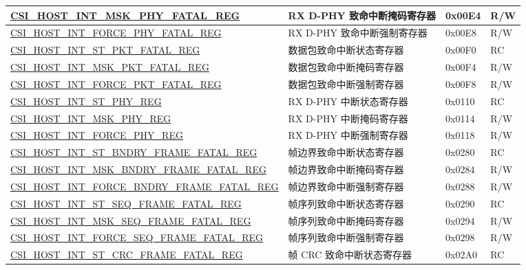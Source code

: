 \begin{longtable}{ | p{8.2cm} | p{6cm} | p{1.2cm} | p{0.8cm} | }
\hyperref[regdesc:CSIHOSTINTMSKPHYFATALREG]{CSI\_HOST\_INT\_MSK\_PHY\_FATAL\_REG} & RX D-PHY 致命中断掩码寄存器 & 0x00E4 & R/W \\ \hline
\hyperref[regdesc:CSIHOSTINTFORCEPHYFATALREG]{CSI\_HOST\_INT\_FORCE\_PHY\_FATAL\_REG} & RX D-PHY 致命中断强制寄存器 & 0x00E8 & R/W \\ \hline
\hyperref[regdesc:CSIHOSTINTSTPKTFATALREG]{CSI\_HOST\_INT\_ST\_PKT\_FATAL\_REG} & 数据包致命中断状态寄存器 & 0x00F0 & RC \\ \hline
\hyperref[regdesc:CSIHOSTINTMSKPKTFATALREG]{CSI\_HOST\_INT\_MSK\_PKT\_FATAL\_REG} & 数据包致命中断掩码寄存器 & 0x00F4 & R/W \\ \hline
\hyperref[regdesc:CSIHOSTINTFORCEPKTFATALREG]{CSI\_HOST\_INT\_FORCE\_PKT\_FATAL\_REG} & 数据包致命中断强制寄存器 & 0x00F8 & R/W \\ \hline
\hyperref[regdesc:CSIHOSTINTSTPHYREG]{CSI\_HOST\_INT\_ST\_PHY\_REG} & RX D-PHY 中断状态寄存器 & 0x0110 & RC \\ \hline
\hyperref[regdesc:CSIHOSTINTMSKPHYREG]{CSI\_HOST\_INT\_MSK\_PHY\_REG} & RX D-PHY 中断掩码寄存器 & 0x0114 & R/W \\ \hline
\hyperref[regdesc:CSIHOSTINTFORCEPHYREG]{CSI\_HOST\_INT\_FORCE\_PHY\_REG} & RX D-PHY 中断强制寄存器 & 0x0118 & R/W \\ \hline
\hyperref[regdesc:CSIHOSTINTSTBNDRYFRAMEFATALREG]{CSI\_HOST\_INT\_ST\_BNDRY\_FRAME\_FATAL\_REG} & 帧边界致命中断状态寄存器 & 0x0280 & RC \\ \hline
\hyperref[regdesc:CSIHOSTINTMSKBNDRYFRAMEFATALREG]{CSI\_HOST\_INT\_MSK\_BNDRY\_FRAME\_FATAL\_REG} & 帧边界致命中断掩码寄存器 & 0x0284 & R/W \\ \hline
\hyperref[regdesc:CSIHOSTINTFORCEBNDRYFRAMEFATALREG]{CSI\_HOST\_INT\_FORCE\_BNDRY\_FRAME\_FATAL\_REG} & 帧边界致命中断强制寄存器 & 0x0288 & R/W \\ \hline
\hyperref[regdesc:CSIHOSTINTSTSEQFRAMEFATALREG]{CSI\_HOST\_INT\_ST\_SEQ\_FRAME\_FATAL\_REG} & 帧序列致命中断状态寄存器 & 0x0290 & RC \\ \hline
\hyperref[regdesc:CSIHOSTINTMSKSEQFRAMEFATALREG]{CSI\_HOST\_INT\_MSK\_SEQ\_FRAME\_FATAL\_REG} & 帧序列致命中断掩码寄存器 & 0x0294 & R/W \\ \hline
\hyperref[regdesc:CSIHOSTINTFORCESEQFRAMEFATALREG]{CSI\_HOST\_INT\_FORCE\_SEQ\_FRAME\_FATAL\_REG} & 帧序列致命中断强制寄存器 & 0x0298 & R/W \\ \hline
\hyperref[regdesc:CSIHOSTINTSTCRCFRAMEFATALREG]{CSI\_HOST\_INT\_ST\_CRC\_FRAME\_FATAL\_REG} & 帧 CRC 致命中断状态寄存器 & 0x02A0 & RC \\ \hline

\end{longtable}
